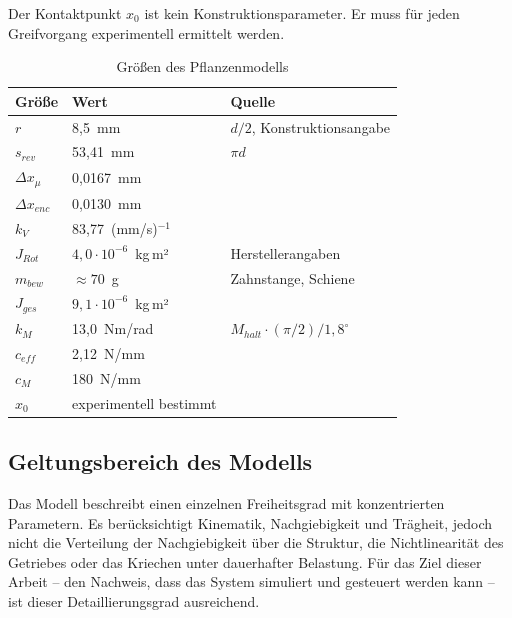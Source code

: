 Der Kontaktpunkt $x_0$ ist kein Konstruktionsparameter. Er muss
für jeden Greifvorgang experimentell ermittelt werden.

\begin{table}[h]
    \centering
    \caption{Größen des Pflanzenmodells}
    \label{tab:modellgroessen}
    \begin{tabular}{|l|l|p{6cm}|}
        \hline
        Größe & Wert & Quelle \\
        \hline
        $r$              & 8,5~mm                        & $d/2$, Konstruktionsangabe \\\hline
        $s_{rev}$        & 53,41~mm                      & $\pi d$ \\\hline
        $\Delta x_{\mu}$ & 0,0167~mm                     & \\\hline
        $\Delta x_{enc}$ & 0,0130~mm                     & \\\hline
        $k_V$            & 83,77~(mm/s)$^{-1}$           & \\\hline
        $J_{Rot}$        & $4,0 \cdot 10^{-6}$~kg\,m²    & Herstellerangaben \\\hline
        $m_{bew}$        & $\approx 70$~g                & Zahnstange, Schiene\\\hline
        $J_{ges}$        & $9,1 \cdot 10^{-6}$~kg\,m²    & \\\hline
        $k_M$            & 13,0~Nm/rad                   & $M_{halt}\cdot(\pi/2)/1,8^\circ$ \\\hline
        $c_{eff}$        & 2,12~N/mm                     & \\\hline
        $c_{M}$          & 180~N/mm                      & \\\hline
        $x_0$            & experimentell bestimmt     & \\
        \hline
    \end{tabular}
\end{table}

\subsection*{Geltungsbereich des Modells}

Das Modell beschreibt einen einzelnen Freiheitsgrad mit konzentrierten Parametern. Es
berücksichtigt Kinematik, Nachgiebigkeit und Trägheit, jedoch nicht die Verteilung der
Nachgiebigkeit über die Struktur, die Nichtlinearität des Getriebes oder das Kriechen unter
dauerhafter Belastung. Für das Ziel dieser Arbeit – den Nachweis, dass das System
simuliert und gesteuert werden kann – ist dieser Detaillierungsgrad ausreichend.



